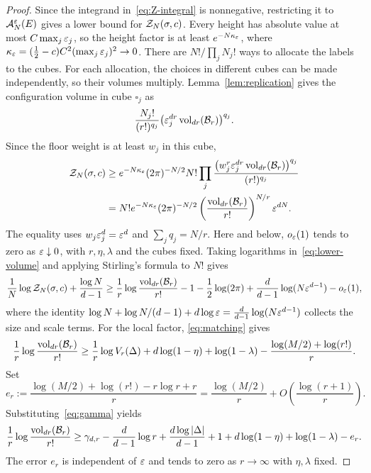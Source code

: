 \documentclass[11pt,letterpaper]{article}
\begin{document}
\begin{proof}
      Since the integrand in~\eqref{eq:Z-integral} is nonnegative, restricting it to $\mathcal A_N^\varepsilon(E)$ gives a lower bound for $\mathcal Z_N(\sigma,c)$. Every height has absolute value at most $C\max_j\varepsilon_j$, so the height factor is at least $e^{-N\kappa_\varepsilon}$, where $\kappa_\varepsilon=(\frac12-c)C^2(\max_j\varepsilon_j)^2\to0$. There are $N!/\prod_jN_j!$ ways to allocate the labels to the cubes. For each allocation, the choices in different cubes can be made independently, so their volumes multiply. Lemma~\ref{lem:replication} gives the configuration volume in cube $\square_j$ as
      \[
            \frac{N_j!}{(r!)^{q_j}}\bigl(\varepsilon_j^{dr}\operatorname{vol}_{dr}(\mathcal B_r)\bigr)^{q_j}.
      \]
      Since the floor weight is at least $w_j$ in this cube,
      \begin{equation}\label{eq:lower-volume}
            \begin{aligned}
                  \mathcal Z_N(\sigma,c)
                   & \ge e^{-N\kappa_\varepsilon}(2\pi)^{-N/2}N!
                  \prod_j\frac{\bigl(w_j^r\varepsilon_j^{dr}\operatorname{vol}_{dr}(\mathcal B_r)\bigr)^{q_j}}{(r!)^{q_j}} \\
                   & =N!e^{-N\kappa_\varepsilon}(2\pi)^{-N/2}
                  \left(\frac{\operatorname{vol}_{dr}(\mathcal B_r)}{r!}\right)^{N/r}\varepsilon^{dN}.
            \end{aligned}
      \end{equation}
      The equality uses $w_j\varepsilon_j^d=\varepsilon^d$ and $\sum_jq_j=N/r$. Here and below, $o_\varepsilon(1)$ tends to zero as $\varepsilon\downarrow0$, with $r,\eta,\lambda$ and the cubes fixed. Taking logarithms in~\eqref{eq:lower-volume} and applying Stirling's formula to $N!$ gives
      \[
            \frac1N\log\mathcal Z_N(\sigma,c)+\frac{\log N}{d-1}
            \ge{} \frac1r\log\frac{\operatorname{vol}_{dr}(\mathcal B_r)}{r!}
            -1-\frac12\log(2\pi)
            +\frac d{d-1}\log(N\varepsilon^{d-1})-o_\varepsilon(1),
      \]
      where the identity $\log N+\log N/(d-1)+d\log\varepsilon=\frac d{d-1}\log(N\varepsilon^{d-1})$ collects the size and scale terms.
      For the local factor, \eqref{eq:matching} gives
      \[
            \frac1r\log\frac{\operatorname{vol}_{dr}(\mathcal B_r)}{r!}
            \ge\frac1r\log V_r(\Delta)+d\log(1-\eta)+\log(1-\lambda)
            -\frac{\log(M/2)+\log(r!)}r.
      \]
      Set
      \[
            e_r:=\frac{\log(M/2)+\log(r!)-r\log r+r}{r}
            =\frac{\log(M/2)}r+O\!\left(\frac{\log(r+1)}r\right).
      \]
      Substituting~\eqref{eq:gamma} yields
      \[
            \frac1r\log\frac{\operatorname{vol}_{dr}(\mathcal B_r)}{r!}
            \ge{} \gamma_{d,r}-\frac d{d-1}\log r
            +\frac{d\log|\Delta|}{d-1}+1
            +d\log(1-\eta)+\log(1-\lambda)-e_r.
      \]
      The error $e_r$ is independent of $\varepsilon$ and tends to zero as $r\to\infty$ with $\eta,\lambda$ fixed.


\end{proof}
\end{document}
